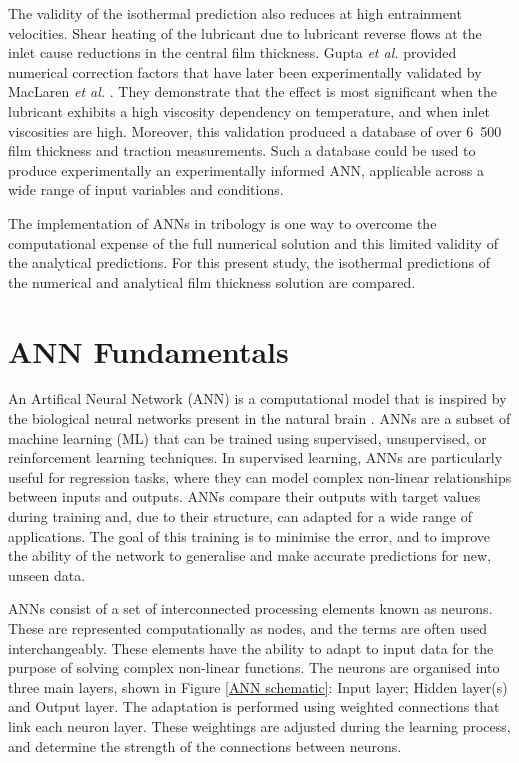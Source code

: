 The validity of the isothermal prediction also reduces at high entrainment velocities. Shear heating of the lubricant due to lubricant reverse flows at the inlet cause reductions in the central film thickness. Gupta \textit{et al.} \cite{Gupta1992} provided numerical correction factors that have later been experimentally validated by MacLaren \textit{et al.} \cite{MacLaren2024}. They demonstrate that the effect is most significant when the lubricant exhibits a high viscosity dependency on temperature, and when inlet viscosities are high. Moreover, this validation produced a database of over 6~500 film thickness and traction measurements. Such a database could be used to produce experimentally an experimentally informed ANN, applicable across a wide range of input variables and conditions.

The implementation of ANNs in tribology is one way to overcome the computational expense of the full numerical solution and this limited validity of the analytical predictions. For this present study, the isothermal predictions of the numerical and analytical film thickness solution are compared.

\section{ANN Fundamentals}

An Artifical Neural Network (ANN) is a computational model that is inspired by the biological neural networks present in the natural brain \cite{Sarkar2017}. ANNs are a subset of machine learning (ML) that can be trained using supervised, unsupervised, or reinforcement learning techniques. In supervised learning, ANNs are particularly useful for regression tasks, where they can model complex non-linear relationships between inputs and outputs. ANNs compare their outputs with target values during training and, due to their structure, can adapted for a wide range of applications. The goal of this training is to minimise the error, and to improve the ability of the network to generalise and make accurate predictions for new, unseen data.

ANNs consist of a set of interconnected processing elements known as neurons. These are represented computationally as nodes, and the terms are often used interchangeably. These elements have the ability to adapt to input data for the purpose of solving complex non-linear functions. The neurons are organised into three main layers, shown in Figure \ref{ANN schematic}: Input layer; Hidden layer(s) and Output layer. The adaptation is performed using weighted connections that link each neuron layer. These weightings are adjusted during the learning process, and determine the strength of the connections between neurons.

